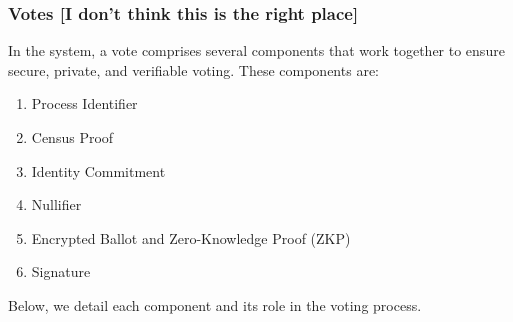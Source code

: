\subsubsection{Votes [I don't think this is the right place]}

In the \davinci system, a vote comprises several components that work together to ensure secure, private, and verifiable voting. These components are:

\begin{enumerate}
	\item Process Identifier
	\item Census Proof
	\item Identity Commitment
	\item Nullifier
	\item Encrypted Ballot and Zero-Knowledge Proof (ZKP)
	\item Signature	
\end{enumerate}

Below, we detail each component and its role in the voting process.

